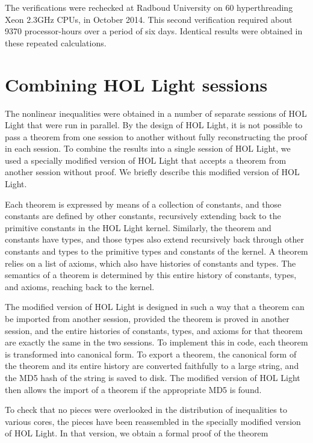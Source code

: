 The verifications were rechecked at Radboud University on 
60 hyperthreading Xeon 2.3GHz CPUs, in October 2014.  This
second verification required about 9370 processor-hours over a period of six
days.  Identical results were obtained in these repeated calculations.

\section{Combining HOL Light sessions}

The nonlinear inequalities were obtained in a number of separate sessions
of HOL Light that were run in parallel.  By the design of HOL Light, it
is not possible to pass a theorem from one session to another without
fully reconstructing the proof in each session.  
To combine the results into a single session of HOL Light, we used a
specially modified version of HOL Light that accepts a theorem from
another session without proof.  We briefly describe this modified
version of HOL Light.

Each theorem is expressed by means of a collection of constants, and
those constants are defined by other constants, recursively extending
back to the primitive constants in the HOL Light kernel.  Similarly,
the theorem and constants have types, and those types also extend
recursively back through other constants and types to the primitive
types and constants of the kernel.  A theorem relies on a list of
axioms, which also have histories of constants and types.  The
semantics of a theorem is determined by this entire history of
constants, types, and axioms, reaching back to the kernel.

The modified version of HOL Light is designed in such a way that a
theorem can be imported from another session, provided the theorem is
proved in another session, and the entire histories of constants,
types, and axioms for that theorem are exactly the same in the two
sessions.  To implement this in code, each theorem is transformed into
canonical form.  To export a theorem, the canonical form of the
theorem and its entire history are converted faithfully to a large
string, and the MD5 hash of the string is saved to disk.  The modified
version of HOL Light then allows the import of a theorem if the
appropriate MD5 is found.  

To check that no pieces were overlooked in the distribution of
inequalities to various cores, the pieces have been reassembled in the
specially modified version of HOL Light.  In that version, we obtain
a formal proof of the theorem

